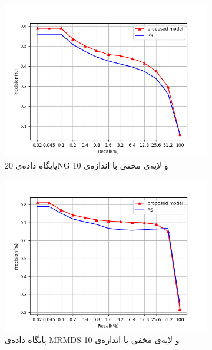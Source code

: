 \begin{figure}[!b]
	\centering
	\begin{subfigure}{.47\textwidth}
		\includegraphics[scale =.5]{chap5-img/ir-3}
		\caption{پایگاه داده‌ی 20NG و لایه‌ی مخفی با اندازه‌ی 10}
		\label{chap5-fig7sub3}
	\end{subfigure}
	\begin{subfigure}{.47\textwidth}
		\includegraphics[scale =.5]{chap5-img/ir-4}
		\caption{ پایگاه داده‌ی MRMDS و لایه‌ی مخفی با اندازه‌ی 10}
		\label{chap5-fig7sub4}
	\end{subfigure}
	\begin{subfigure}{.47\textwidth}

\end{subfigure}
\end{figure}
